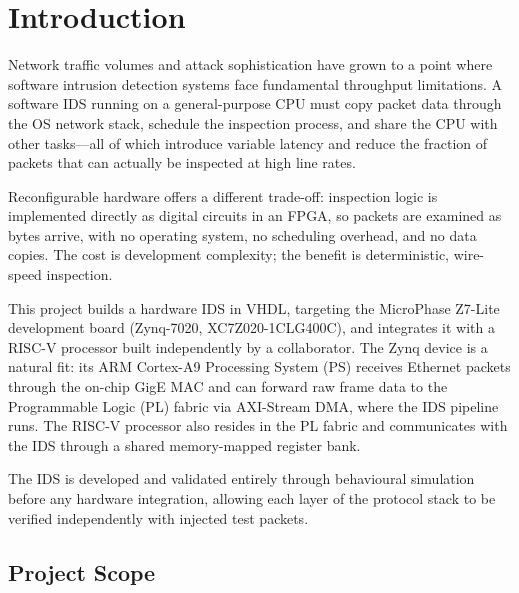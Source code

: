 \documentclass[12pt, a4paper]{report}
\begin{document}
\listoffigures
\clearpage

\listoftables
\clearpage


\chapter{Introduction}

Network traffic volumes and attack sophistication have grown to a point where software intrusion detection systems face fundamental throughput limitations. A software IDS running on a general-purpose CPU must copy packet data through the OS network stack, schedule the inspection process, and share the CPU with other tasks---all of which introduce variable latency and reduce the fraction of packets that can actually be inspected at high line rates.

Reconfigurable hardware offers a different trade-off: inspection logic is implemented directly as digital circuits in an FPGA, so packets are examined as bytes arrive, with no operating system, no scheduling overhead, and no data copies. The cost is development complexity; the benefit is deterministic, wire-speed inspection.

This project builds a hardware IDS in VHDL, targeting the MicroPhase Z7-Lite development board (Zynq-7020, XC7Z020-1CLG400C), and integrates it with a RISC-V processor built independently by a collaborator. The Zynq device is a natural fit: its ARM Cortex-A9 Processing System (PS) receives Ethernet packets through the on-chip GigE MAC and can forward raw frame data to the Programmable Logic (PL) fabric via AXI-Stream DMA, where the IDS pipeline runs. The RISC-V processor also resides in the PL fabric and communicates with the IDS through a shared memory-mapped register bank.

The IDS is developed and validated entirely through behavioural simulation before any hardware integration, allowing each layer of the protocol stack to be verified independently with injected test packets.

\section{Project Scope}
\end{document}
